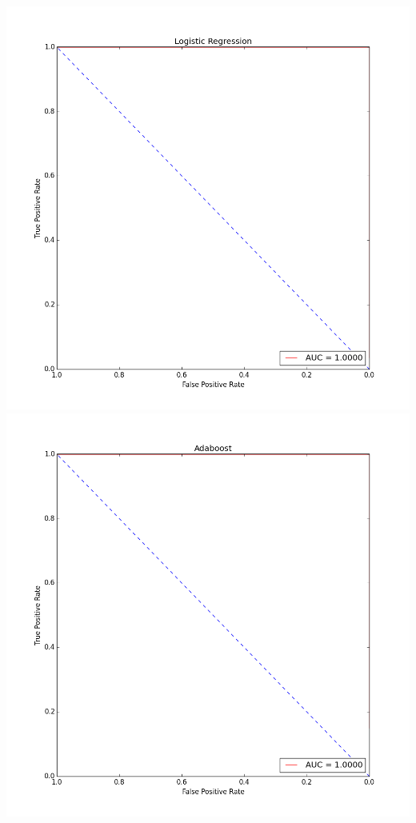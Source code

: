 \documentclass[fleqn]{article}
\begin{document}
    \begin{center}
        \includegraphics[scale=0.2]{roc_LR.png}
        \includegraphics[scale=0.2]{roc_Adaboost.png}
    \end{center}
\end{document}
